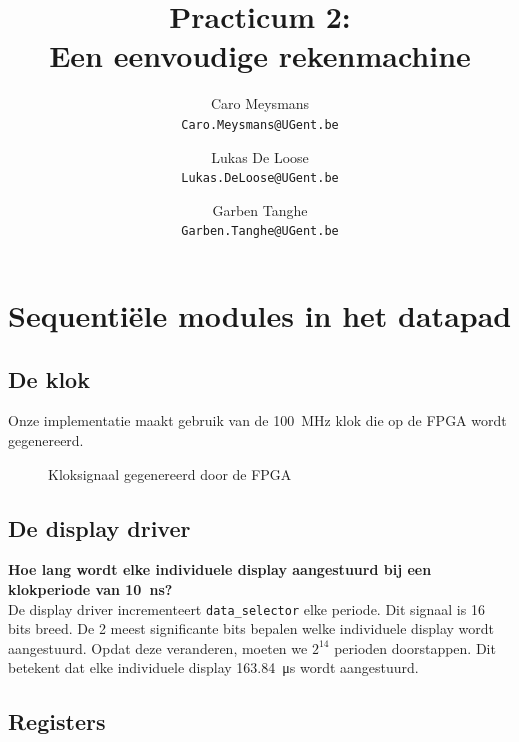 \documentclass[titlepage]{article}
\title{
    Practicum 2: \\
    \large{Een eenvoudige rekenmachine}
}
\author{
    Caro Meysmans \\
    \texttt{Caro.Meysmans@UGent.be}
    \and
    Lukas De Loose \\
    \texttt{Lukas.DeLoose@UGent.be}
    \and
    Garben Tanghe \\
    \texttt{Garben.Tanghe@UGent.be}
}
\newcommand{\question}[1]{\noindent \textbf{#1} \\}
\begin{document}
\maketitle

\tableofcontents
\listoffigures

\clearpage

\section{Sequentiële modules in het datapad}

\subsection{De klok}

Onze implementatie maakt gebruik van de \SI{100}{\mega\hertz} klok die op de FPGA wordt gegenereerd.

\begin{figure}[h!]
    \centering


    \caption{Kloksignaal gegenereerd door de FPGA}
    \label{fig:kloksignaal}
\end{figure}

\subsection{De display driver}

\question{Hoe lang wordt elke individuele display aangestuurd bij een klokperiode van \SI{10}{\nano\second}?}
De display driver incrementeert \texttt{data\_selector} elke periode.
Dit signaal is 16 bits breed.
De 2 meest significante bits bepalen welke individuele display wordt aangestuurd.
Opdat deze veranderen, moeten we \( 2^{14} \) perioden doorstappen.
Dit betekent dat elke individuele display \SI{163.84}{\micro\second} wordt aangestuurd.

\subsection{Registers}
\end{document}
